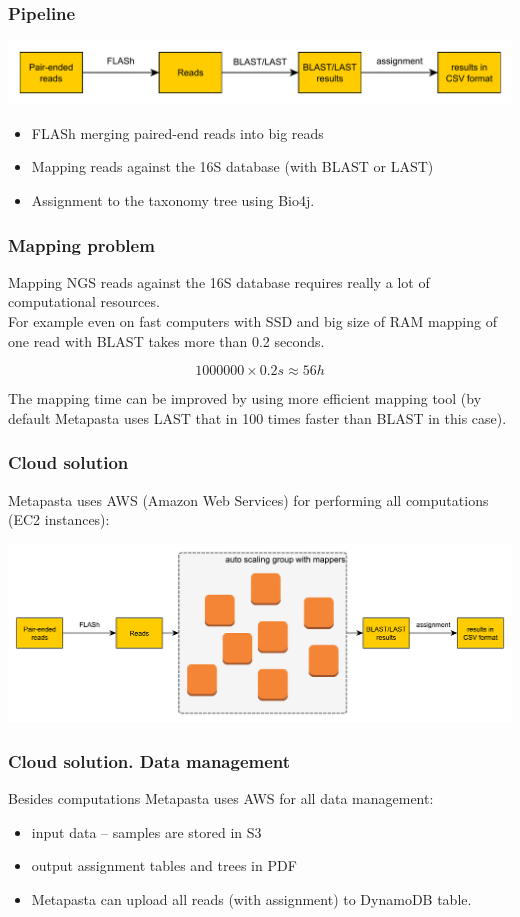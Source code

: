 \documentclass{beamer}
\begin{document}
\begin{frame}
\frametitle{Pipeline}
\includegraphics[width=\textwidth]{general.pdf}

\begin{itemize}
  \item FLASh merging paired-end reads into big reads
  \item Mapping reads against the 16S database (with BLAST or LAST)
  \item Assignment to the taxonomy tree using Bio4j.
\end{itemize}
\end{frame}

\begin{frame}
\frametitle{Mapping problem}
Mapping NGS reads against the 16S database requires really a lot of computational resources.
\\
For example even on fast computers with SSD and big size of RAM mapping of one read with BLAST takes more than 0.2 seconds.

$$ 1 000 000 \times 0.2 s \approx 56 h $$

The mapping time can be improved by using more efficient mapping tool (by default Metapasta uses LAST that in 100 times faster than BLAST in this case).
\end{frame}

\begin{frame}
\frametitle{Cloud solution}

Metapasta uses AWS (Amazon Web Services) for performing all computations (EC2 instances):

\includegraphics[width=\textwidth]{pipeline_dist.pdf}
\end{frame}



\begin{frame}
\frametitle{Cloud solution. Data management}
Besides computations Metapasta uses AWS for all data management:
\begin{itemize}
  \item input data -- samples are stored in S3
  \item output assignment tables and trees in PDF
  \item Metapasta can upload all reads (with assignment) to DynamoDB table.
\end{itemize}
\end{frame}
\end{document}
